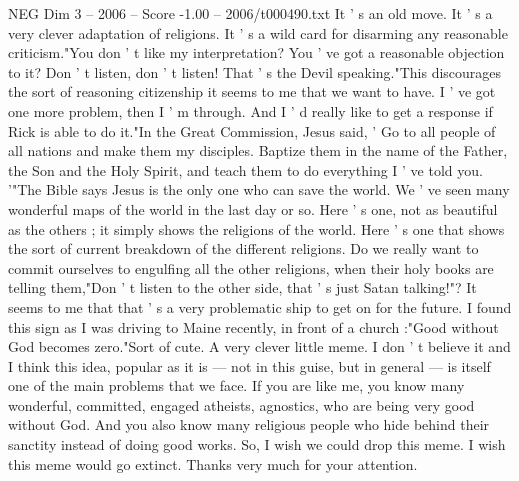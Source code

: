 \begin{textsample}{NEG Dim 3 – 2006 – Score -1.00 – 2006/t000490.txt}
It ' s an old move.
It ' s a very clever adaptation of religions.
It ' s a wild card for disarming any reasonable criticism."You don ' t like my interpretation?
You ' ve got a reasonable objection to it?
Don ' t listen, don ' t listen!
That ' s the Devil speaking."This discourages the sort of reasoning citizenship it seems to me that we want to have.
I ' ve got one more problem, then I ' m through.
And I ' d really like to get a response if Rick is able to do it."In the Great Commission, Jesus said, ' Go to all people of all nations and make them my disciples.
Baptize them in the name of the Father, the Son and the Holy Spirit, and teach them to do everything I ' ve told you. '"The Bible says Jesus is the only one who can save the world.
We ' ve seen many wonderful maps of the world in the last day or so.
Here ' s one, not as beautiful as the others ; it simply shows the religions of the world.
Here ' s one that shows the sort of current breakdown of the different religions.
Do we really want to commit ourselves to engulfing all the other religions, when their holy books are telling them,"Don ' t listen to the other side, that ' s just Satan talking!"?
It seems to me that that ' s a very problematic ship to get on for the future.
I found this sign as I was driving to Maine recently, in front of a church :"Good without God becomes zero."Sort of cute.
A very clever little meme.
I don ' t believe it and I think this idea, popular as it is — not in this guise, but in general — is itself one of the main problems that we face.
If you are like me, you know many wonderful, committed, engaged atheists, agnostics, who are being very good without God.
And you also know many religious people who hide behind their sanctity instead of doing good works.
So, I wish we could drop this meme.
I wish this meme would go extinct.
Thanks very much for your attention.

\end{textsample}
